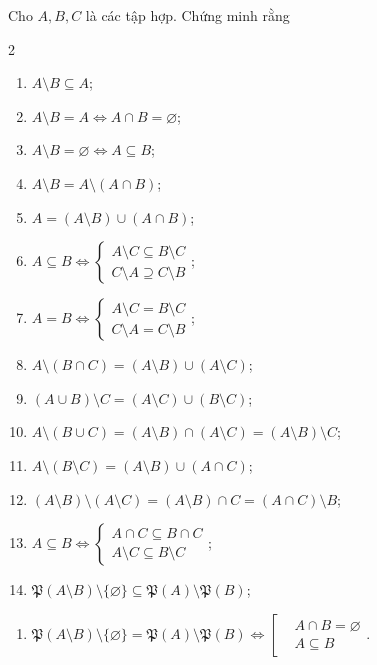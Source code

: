 \exercise Cho $A, B, C$ là các tập hợp. Chứng minh rằng
\begin{multicols}{2}
   \begin{enumerate}
      \item $A \setminus B \subseteq A$;
      \item $A \setminus B = A \iff A \cap B = \varnothing$;
      \item $A \setminus B = \varnothing \iff A \subseteq B$;
      \item $A \setminus B = A \setminus (A \cap B)$;
      \item $A = (A \setminus B) \cup (A \cap B)$;
      \item $A \subseteq B \iff \begin{cases}
         A \setminus C \subseteq B \setminus C \\
         C \setminus A \supseteq C \setminus B
      \end{cases}$;
      \item $A = B \iff \begin{cases}
         A \setminus C = B \setminus C \\
         C \setminus A = C \setminus B
      \end{cases}$;
      \item $A \setminus (B\cap C) = (A \setminus B) \cup (A \setminus C)$;
      \item $(A \cup B) \setminus C = (A \setminus C) \cup (B \setminus C)$;
      \item $A \setminus (B \cup C) = (A \setminus B) \cap (A \setminus C) = (A \setminus B) \setminus C$;
      \item $A \setminus (B \setminus C) = (A \setminus B) \cup (A \cap C)$;
      \item $(A \setminus B) \setminus (A \setminus C) = (A \setminus B) \cap C = (A \cap C) \setminus B$;
      \item $A \subseteq B \iff \begin{cases}
         A \cap C \subseteq B \cap C \\
         A \setminus C \subseteq B \setminus C
      \end{cases}$;
      \item $\mathfrak{P}(A \setminus B) \setminus \{\varnothing\} \subseteq \mathfrak{P}(A) \setminus \mathfrak{P}(B)$;
      \setcounter{subexercise}{\value{enumi}}
   \end{enumerate}
\end{multicols}

\begin{enumerate}
   \setcounter{enumi}{\value{subexercise}}
   \item $\mathfrak{P}(A \setminus B) \setminus \{\varnothing\} = \mathfrak{P}(A) \setminus \mathfrak{P}(B) \iff \left[\begin{aligned}
      &A \cap B = \varnothing \\
      &A \subseteq B
   \end{aligned}\right.$.
\end{enumerate}

